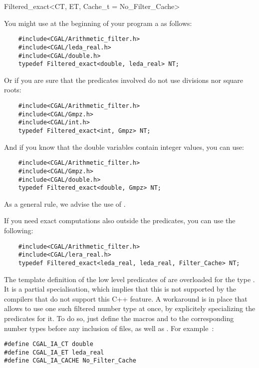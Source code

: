 \begin{ccClassTemplate}{Filtered_exact<CT, ET, Cache_t = No_Filter_Cache>}
\ccExample

You might use at the beginning of your program a  as follows:

\begin{verbatim}
    #include<CGAL/Arithmetic_filter.h>
    #include<CGAL/leda_real.h>
    #include<CGAL/double.h>
    typedef Filtered_exact<double, leda_real> NT;
\end{verbatim}

Or if you are sure that the predicates involved do not use divisions nor
square roots:

\begin{verbatim}
    #include<CGAL/Arithmetic_filter.h>
    #include<CGAL/Gmpz.h>
    #include<CGAL/int.h>
    typedef Filtered_exact<int, Gmpz> NT;
\end{verbatim}

And if you know that the double variables contain integer values, you can
use:

\begin{verbatim}
    #include<CGAL/Arithmetic_filter.h>
    #include<CGAL/Gmpz.h>
    #include<CGAL/double.h>
    typedef Filtered_exact<double, Gmpz> NT;
\end{verbatim}

As a general rule, we advise the use of
.

If you need exact computations also outside the predicates, you can use the
following:

\begin{verbatim}
    #include<CGAL/Arithmetic_filter.h>
    #include<CGAL/lera_real.h>
    typedef Filtered_exact<leda_real, leda_real, Filter_Cache> NT;
\end{verbatim}


\ccImplementation

The template definition of the low level predicates of {\cgal} are overloaded
for the type .  It is a partial specialisation,
which implies that this is not supported by the compilers that do not support
this C++ feature.  A workaround is in place that allows to use
one such filtered number type at once, by explicitely specializing the
predicates for it.  To do so, just define the macros  and
 to the corresponding number types before any inclusion of
{\cgal} files, as well as .  For example~:

\begin{verbatim} 
#define CGAL_IA_CT double
#define CGAL_IA_ET leda_real
#define CGAL_IA_CACHE No_Filter_Cache
\end{verbatim}


\end{ccClassTemplate}
